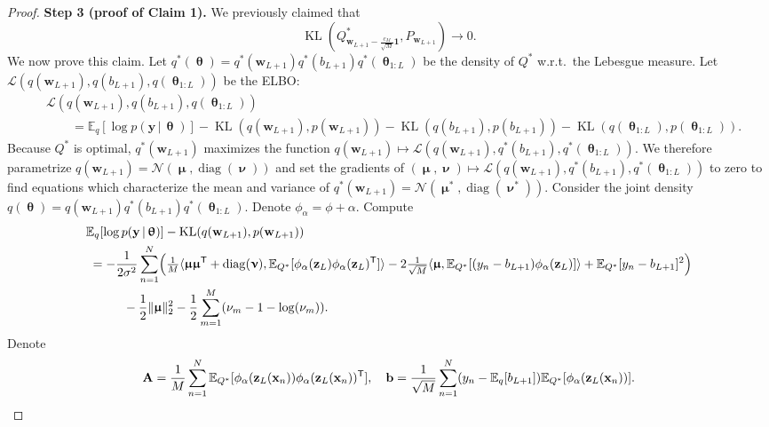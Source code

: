 \documentclass[twoside]{article}
\newcommand{\vb}{\mathbf{b}}
\newcommand{\vw}{\mathbf{w}}
\newcommand{\vx}{\mathbf{x}}
\newcommand{\vy}{\mathbf{y}}
\newcommand{\vz}{\mathbf{z}}
\newcommand{\vmu}{\bm{\upmu}}
\newcommand{\vnu}{\bm{\upnu}}
\newcommand{\vtheta}{\bm{\uptheta}}
\newcommand{\vone}{\mathbf{1}}
\newcommand{\mA}{\mathbf{A}}
\newcommand{\E}{\mathbb{E}}
\renewcommand{\L}{\mathcal{L}}
\newcommand{\T}{\text{\textsf{T}}}
\newcommand{\opspace}{}
\newcommand{\diag}{\operatorname{diag}\opspace}
\newcommand{\KL}{\operatorname{KL}}
\newcommand{\Normal}{\mathcal{N}}
\newcommand{\cond}{\,|\,}                  %
\DeclarePairedDelimiter\parens{(}{)}             %
\DeclarePairedDelimiter\lra{\langle}{\rangle}    %
\DeclarePairedDelimiter\norm{\|}{\|}             %
\theoremstyle{theoremstyle}
\begin{document}
\begin{proof}
    \textbf{Step 3 (proof of Claim 1).}
    We previously claimed that
    \begin{equation}
        \KL(Q^*_{\vw_{L+1} - \frac{c_M}{\sqrt{M}} \vone}, P_{\vw_{L+1}}) \to 0.
    \end{equation}
    We now prove this claim.
    Let $q^*(\vtheta) = q^*(\vw_{L+1})q^*(b_{L+1})q^*(\vtheta_{1:L})$ be the density of $Q^*$ w.r.t.\ the Lebesgue measure.
    Let $\L(q(\vw_{L+1}),q(b_{L+1}),q(\vtheta_{1:L}))$ be the ELBO:
    \begin{align}
        &\L(q(\vw_{L+1}),q(b_{L+1}),q(\vtheta_{1:L})) \nonumber \\
        &\qquad= \E_q[\log p(\vy \cond \vtheta)]
            - \KL(q(\vw_{L+1}),p(\vw_{L+1}))
            - \KL(q(b_{L+1}),p(b_{L+1}))
            - \KL(q(\vtheta_{1:L}),p(\vtheta_{1:L})).
    \end{align}
    Because $Q^*$ is optimal, $q^*(\vw_{L+1})$ maximizes the function $q(\vw_{L+1}) \mapsto \L(q(\vw_{L+1}),q^*(b_{L+1}),q^*(\vtheta_{1:L}))$.
    We therefore parametrize $q(\vw_{L+1}) = \Normal(\vmu, \diag(\vnu))$ and set the gradients of $(\vmu, \vnu) \mapsto \L(q(\vw_{L+1}),q^*(b_{L+1}),q^*(\vtheta_{1:L}))$ to zero to find equations which characterize the mean and variance of $q^*(\vw_{L+1}) = \Normal(\vmu^*, \diag(\vnu^*))$.
    Consider the joint density $q(\vtheta) = q(\vw_{L+1})q^*(b_{L+1})q^*(\vtheta_{1:L})$.
    Denote $\phi_\alpha = \phi + \alpha$.
    Compute
    \begin{align}
        &\E_q[\log p(\vy \cond \vtheta)]
        - \KL(q(\vw_{L+1}),p(\vw_{L+1})) \nonumber \\
        &\;
        = -\frac1{2\sigma^2}\sum_{n=1}^N
        \parens*{
            \tfrac1M\lra{
                \vmu \vmu^\T + \diag(\vnu),
                \E_{Q^*}[\phi_\alpha(\vz_L)\phi_\alpha(\vz_L)^\T]
            }
            - 2 \tfrac{1}{\sqrt{M}}\lra{
                    \vmu,
                    \E_{Q^*}[(y_n - b_{L+1})\phi_\alpha(\vz_L)]
            }
            + \E_{Q^*}[y_n - b_{L+1}]^2
        } \nonumber\\
        &\quad\qquad - \frac12 \norm{\vmu}_2^2 - \frac12 \sum_{m=1}^M(\nu_m - 1 - \log(\nu_m)).
    \end{align}
    Denote
    \begin{equation}
        \mA = \frac1M \sum_{n=1}^N \E_{Q^*}[\phi_\alpha(\vz_L(\vx_n))\phi_\alpha(\vz_L(\vx_n))^\T],
        \quad
        \vb = \frac1{\sqrt{M}}\sum_{n=1}^N(y_n - \E_q[b_{L+1}]) \E_{Q^*}[\phi_\alpha(\vz_L(\vx_n))].
    \end{equation}

\end{proof}
\end{document}
